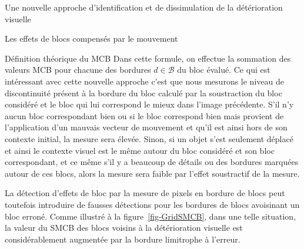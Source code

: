 \documentclass[letterpaper, twoside, 12pt,memoire]{thETS}
\newcommand{\SC}[1]{%
	{
	\todo[inline,color={red!100!green!33!}]{%
	\textbf{[SC]:}~#1}
	}}
\newcommand{\fig}[1]{figure~\ref{#1}}
\begin{document}
\begin{chapter}{Une nouvelle approche d'identification et de dissimulation de la
détérioration visuelle}
\begin{section}{Les effets de blocs compensés par le mouvement}
\begin{subsection}{Définition théorique du MCB}
Dans cette formule, on effectue la sommation des valeurs MCB pour chacune des
bordures $d \in \mathcal{B}$ du bloc évalué. Ce qui est intéressant avec cette nouvelle approche c'est que nous mesurons le niveau de discontinuité présent à la bordure du bloc calculé par la soustraction du bloc considéré et le bloc qui lui correspond le mieux dans l'image précédente. S'il n'y aucun bloc correspondant bien ou si le bloc correspond bien mais provient de l'application d'un mauvais vecteur de mouvement et qu'il est ainsi hors de son contexte initial, la mesure sera élevée. Sinon, si un objet s'est seulement déplacé et ainsi le contexte visuel est le même autour du bloc considéré et son bloc correspondant, et ce même s'il y a beaucoup de détails ou des bordures marquées autour de ces blocs, alors la mesure sera faible par l'effet soustractif de la mesure.\SC{une figure pour illustrée ces cas?}

La détection d'effets de bloc par la mesure de pixels en bordure de blocs peut toutefois
introduire de fausses détections pour les bordures de blocs avoisinant un bloc
erroné. Comme illustré à la \fig{fig-GridSMCB}, dans une telle situation, la
valeur du SMCB des blocs voisins à la détérioration visuelle est
considérablement augmentée par la bordure limitrophe à l'erreur.


\end{subsection}
\end{section}
\end{chapter}
\end{document}
